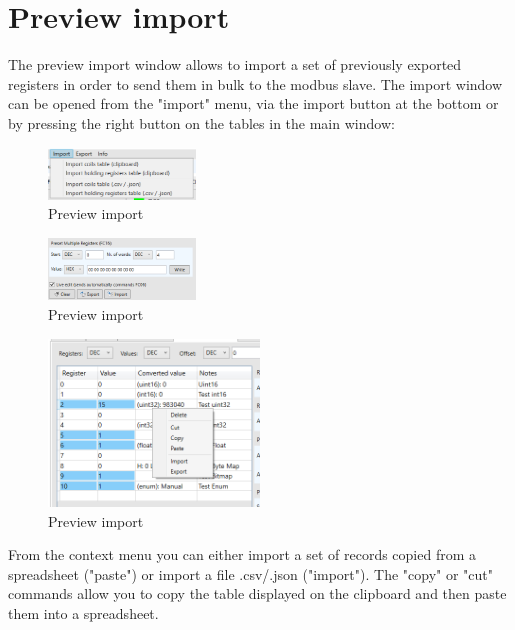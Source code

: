 
\chapter{Preview import}

The preview import window allows
to import a set of previously exported registers
in order to send them in bulk to the modbus slave.
The import window can be opened from the "import" menu, 
via the import button at the bottom or by pressing the
right button on the tables in the main window:

\begin{figure}[H]
\centering
\includegraphics[width=0.35\textwidth]{../Img/Menu_Import.PNG}
\caption{Preview import}
\end{figure}

\begin{figure}[H]
\centering
\includegraphics[width=0.35\textwidth]{../Img/PreviewImport_OpenButton.PNG}
\caption{Preview import}
\end{figure}

\begin{figure}[H]
\centering
\includegraphics[width=0.50\textwidth]{../Img/PreviewImport_Open.PNG}
\caption{Preview import}
\end{figure}

From the context menu you can either import a set of records
copied from a spreadsheet ("paste") or import a file
.csv/.json ("import"). The "copy" or "cut" commands allow you to copy 
the table displayed on the clipboard and then paste them into a spreadsheet.

